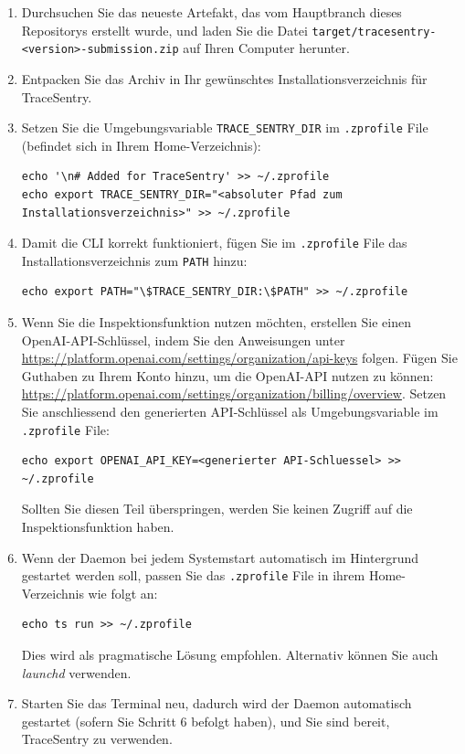\documentclass[a4paper,12pt]{report}
\begin{document}
    \begin{enumerate}
        \item Durchsuchen Sie das neueste Artefakt, das vom Hauptbranch dieses Repositorys erstellt wurde, und laden Sie die Datei
        \texttt{target/tracesentry-\textless{}version\textgreater{}-submission.zip} auf Ihren Computer herunter.
        \item Entpacken Sie das Archiv in Ihr gewünschtes Installationsverzeichnis für TraceSentry.
        \item Setzen Sie die Umgebungsvariable \texttt{TRACE\_SENTRY\_DIR} im \texttt{.zprofile} File (befindet sich in Ihrem Home-Verzeichnis):
        \begin{lstlisting}[label={lst:lstlisting-mac-1}]
echo '\n# Added for TraceSentry' >> ~/.zprofile
echo export TRACE_SENTRY_DIR="<absoluter Pfad zum Installationsverzeichnis>" >> ~/.zprofile
        \end{lstlisting}
        \item Damit die CLI korrekt funktioniert, fügen Sie im \texttt{.zprofile} File das Installationsverzeichnis zum \texttt{PATH} hinzu:
        \begin{lstlisting}[label={lst:lstlisting-mac-2}]
echo export PATH="\$TRACE_SENTRY_DIR:\$PATH" >> ~/.zprofile
        \end{lstlisting}
        \item Wenn Sie die Inspektionsfunktion nutzen möchten, erstellen Sie einen OpenAI-API-Schlüssel, indem Sie den Anweisungen unter \url{https://platform.openai.com/settings/organization/api-keys} folgen.
        Fügen Sie Guthaben zu Ihrem Konto hinzu, um die OpenAI-API nutzen zu können: \url{https://platform.openai.com/settings/organization/billing/overview}.
        Setzen Sie anschliessend den generierten API-Schlüssel als Umgebungsvariable im \texttt{.zprofile} File:
        \begin{lstlisting}[label={lst:lstlisting-mac-3}]
echo export OPENAI_API_KEY=<generierter API-Schluessel> >> ~/.zprofile
        \end{lstlisting}
        Sollten Sie diesen Teil überspringen, werden Sie keinen Zugriff auf die Inspektionsfunktion haben.
        \item Wenn der Daemon bei jedem Systemstart automatisch im Hintergrund gestartet werden soll, passen Sie das \texttt{.zprofile} File in ihrem Home-Verzeichnis wie folgt an:
        \begin{lstlisting}[label={lst:lstlisting-mac-4}]
echo ts run >> ~/.zprofile
        \end{lstlisting}
        Dies wird als pragmatische Lösung empfohlen.
        Alternativ können Sie auch \textit{launchd} verwenden. \cite{appleDeveloper}
        \item Starten Sie das Terminal neu, dadurch wird der Daemon automatisch gestartet (sofern Sie Schritt 6 befolgt haben), und Sie sind bereit, TraceSentry zu verwenden.
    \end{enumerate}
\end{document}
